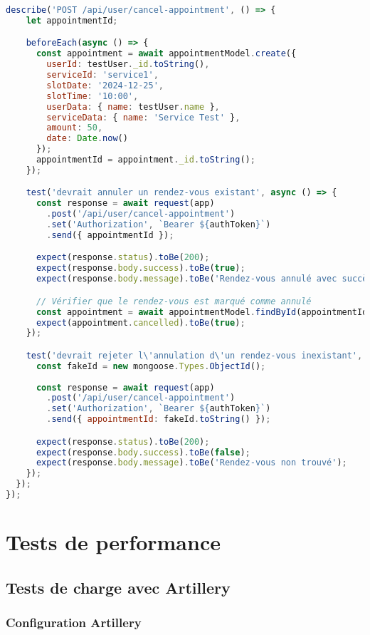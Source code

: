 \begin{lstlisting}[language=JavaScript, caption=appointmentService.integration.test.js]
  describe('POST /api/user/cancel-appointment', () => {
    let appointmentId;

    beforeEach(async () => {
      const appointment = await appointmentModel.create({
        userId: testUser._id.toString(),
        serviceId: 'service1',
        slotDate: '2024-12-25',
        slotTime: '10:00',
        userData: { name: testUser.name },
        serviceData: { name: 'Service Test' },
        amount: 50,
        date: Date.now()
      });
      appointmentId = appointment._id.toString();
    });

    test('devrait annuler un rendez-vous existant', async () => {
      const response = await request(app)
        .post('/api/user/cancel-appointment')
        .set('Authorization', `Bearer ${authToken}`)
        .send({ appointmentId });

      expect(response.status).toBe(200);
      expect(response.body.success).toBe(true);
      expect(response.body.message).toBe('Rendez-vous annulé avec succès');

      // Vérifier que le rendez-vous est marqué comme annulé
      const appointment = await appointmentModel.findById(appointmentId);
      expect(appointment.cancelled).toBe(true);
    });

    test('devrait rejeter l\'annulation d\'un rendez-vous inexistant', async () => {
      const fakeId = new mongoose.Types.ObjectId();
      
      const response = await request(app)
        .post('/api/user/cancel-appointment')
        .set('Authorization', `Bearer ${authToken}`)
        .send({ appointmentId: fakeId.toString() });

      expect(response.status).toBe(200);
      expect(response.body.success).toBe(false);
      expect(response.body.message).toBe('Rendez-vous non trouvé');
    });
  });
});
\end{lstlisting}

\section{Tests de performance}

\subsection{Tests de charge avec Artillery}

\subsubsection{Configuration Artillery}

